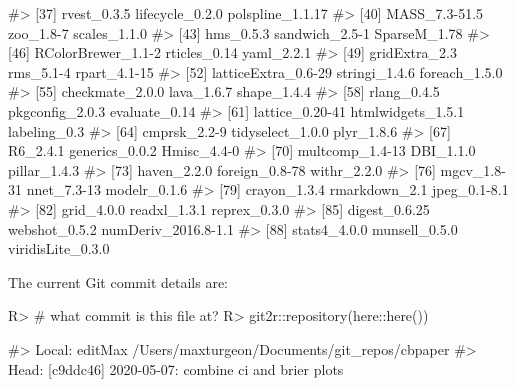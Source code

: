 \documentclass[
]{jss}
\begin{document}
\begin{CodeChunk}
\begin{CodeOutput}
#> [37] rvest_0.3.5         lifecycle_0.2.0     polspline_1.1.17   
#> [40] MASS_7.3-51.5       zoo_1.8-7           scales_1.1.0       
#> [43] hms_0.5.3           sandwich_2.5-1      SparseM_1.78       
#> [46] RColorBrewer_1.1-2  rticles_0.14        yaml_2.2.1         
#> [49] gridExtra_2.3       rms_5.1-4           rpart_4.1-15       
#> [52] latticeExtra_0.6-29 stringi_1.4.6       foreach_1.5.0      
#> [55] checkmate_2.0.0     lava_1.6.7          shape_1.4.4        
#> [58] rlang_0.4.5         pkgconfig_2.0.3     evaluate_0.14      
#> [61] lattice_0.20-41     htmlwidgets_1.5.1   labeling_0.3       
#> [64] cmprsk_2.2-9        tidyselect_1.0.0    plyr_1.8.6         
#> [67] R6_2.4.1            generics_0.0.2      Hmisc_4.4-0        
#> [70] multcomp_1.4-13     DBI_1.1.0           pillar_1.4.3       
#> [73] haven_2.2.0         foreign_0.8-78      withr_2.2.0        
#> [76] mgcv_1.8-31         nnet_7.3-13         modelr_0.1.6       
#> [79] crayon_1.3.4        rmarkdown_2.1       jpeg_0.1-8.1       
#> [82] grid_4.0.0          readxl_1.3.1        reprex_0.3.0       
#> [85] digest_0.6.25       webshot_0.5.2       numDeriv_2016.8-1.1
#> [88] stats4_4.0.0        munsell_0.5.0       viridisLite_0.3.0
\end{CodeOutput}
\end{CodeChunk}

The current Git commit details are:

\begin{CodeChunk}

\begin{CodeInput}
R> # what commit is this file at?
R> git2r::repository(here::here())
\end{CodeInput}

\begin{CodeOutput}
#> Local:    editMax /Users/maxturgeon/Documents/git_repos/cbpaper
#> Head:     [c9ddc46] 2020-05-07: combine ci and brier plots
\end{CodeOutput}
\end{CodeChunk}


\end{document}
